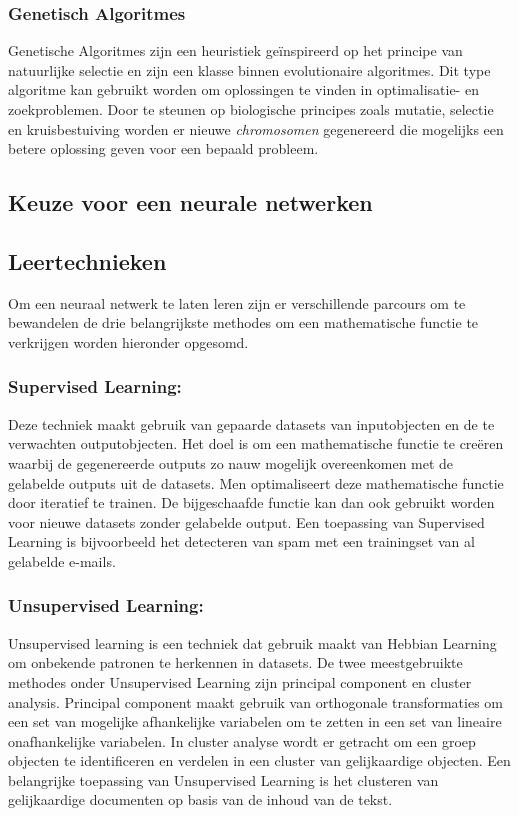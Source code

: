 	\subsubsection{Genetisch Algoritmes}
	Genetische Algoritmes zijn een heuristiek ge\"inspireerd op het principe van natuurlijke selectie en zijn een klasse binnen evolutionaire algoritmes. Dit type algoritme kan gebruikt worden om oplossingen te vinden in optimalisatie- en zoekproblemen. Door te steunen op biologische principes zoals mutatie, selectie en kruisbestuiving worden er nieuwe \textit{chromosomen} gegenereerd die mogelijks een betere oplossing geven voor een bepaald probleem.
\subsection{Keuze voor een neurale netwerken }	
\subsection{Leertechnieken}
Om een neuraal netwerk te laten leren zijn er verschillende parcours om te bewandelen de drie belangrijkste methodes om een mathematische functie te verkrijgen worden hieronder opgesomd.


	\subsubsection{Supervised Learning:} Deze techniek maakt gebruik van gepaarde datasets van inputobjecten en de te verwachten outputobjecten. Het doel is om een mathematische functie te cre\"eren waarbij de gegenereerde outputs zo nauw mogelijk overeenkomen met de gelabelde outputs uit de datasets. Men optimaliseert deze mathematische functie door iteratief te trainen. De bijgeschaafde functie kan dan ook gebruikt worden voor nieuwe datasets zonder gelabelde output. Een toepassing van Supervised Learning is bijvoorbeeld het detecteren van spam met een trainingset van al gelabelde e-mails.
	
	\subsubsection{Unsupervised Learning:} Unsupervised learning is een techniek dat gebruik maakt van Hebbian Learning om onbekende patronen te herkennen in datasets. De twee meestgebruikte methodes onder Unsupervised Learning zijn principal component en cluster analysis. Principal component maakt gebruik van orthogonale transformaties om een set van mogelijke afhankelijke variabelen om te zetten in een set van lineaire onafhankelijke variabelen. In cluster analyse wordt er getracht om een groep objecten te identificeren en verdelen in een cluster van gelijkaardige objecten. 
	Een belangrijke toepassing van Unsupervised Learning is het clusteren van gelijkaardige documenten op basis van de inhoud van de tekst.
